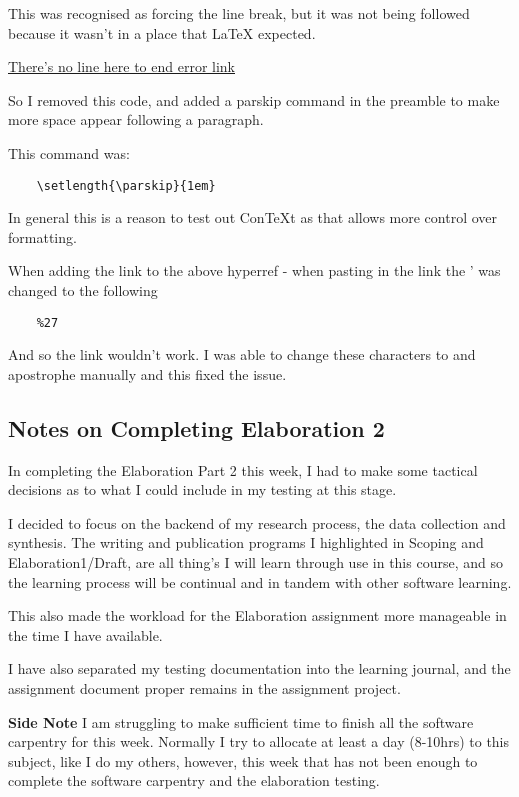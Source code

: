 \documentclass{article}
\begin{document}
This was recognised as forcing the line break, but it was not being followed because it wasn't in a place that LaTeX expected. 

\href{https://www.overleaf.com/learn/latex/Errors/LaTeX_Error:_There's_no_line_here_to_end}{There's no line here to end error link}


So I removed this code, and added a parskip command in the preamble to make more space appear following a paragraph.

This command was:
\begin{verbatim}
    \setlength{\parskip}{1em}
\end{verbatim}

In general this is a reason to test out ConTeXt as that allows more control over formatting. 

\label{Error: copying links to Overleaf}
When adding the link to the above hyperref - when pasting in the link the ' was changed to the following
\begin{verbatim}
    %27
\end{verbatim}

And so the link wouldn't work. I was able to change these characters to and apostrophe manually and this fixed the issue.

\subsection{Notes on Completing Elaboration 2}
In completing the Elaboration Part 2 this week, I had to make some tactical decisions as to what I could include in my testing at this stage. 

I decided to focus on the backend of my research process, the data collection and synthesis. 
The writing and publication programs I highlighted in Scoping and Elaboration1/Draft, are all thing's I will learn through use in this course, and so the learning process will be continual and in tandem with other software learning. 

This also made the workload for the Elaboration assignment more manageable in the time I have available.

I have also separated my testing documentation into the learning journal, and the assignment document proper remains in the assignment project.

\textbf{Side Note}
I am struggling to make sufficient time to finish all the software carpentry for this week. Normally I try to allocate at least a day (8-10hrs) to this subject, like I do my others, however, this week that has not been enough to complete the software carpentry and the elaboration testing.
\end{document}
